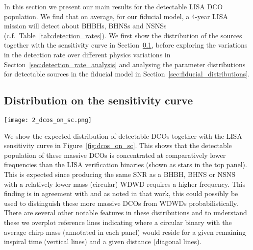 In this section we present our main results for the detectable LISA DCO population. We find that on average, for our fiducial model, a 4-year LISA mission will detect about \BHBHFourYear{} BHBHs, \BHNSFourYear{} BHNSs and \NSNSFourYear{} NSNSs (c.f.\ Table~\ref{tab:detection_rates}). We first show the distribution of the sources together with the sensitivity curve in Section~\ref{sec:dcos_on_sc}, before exploring the variations in the detection rate over different physics variations in Section~\ref{sec:detection_rate_analysis} and analysing the parameter distributions for detectable sources in the fiducial model in Section~\ref{sec:fiducial_distributions}.

\subsection{Distribution on the sensitivity curve}\label{sec:dcos_on_sc}

\begin{figure*}[tp]
    \centering
    \texttt{[image: 2\_dcos\_on\_sc.png]}
    \caption{Density distribution of detectable BHBH, BHNS and NSNS binaries are shown together with the LISA sensitivity curve. In the top panel we show all systems with the LISA verification binaries over plotted (star symbols, \citealp{Kupfer+2018}). In the bottom panels we separate by type. Contours show the percentage of the population enclosed. The remaining 2\% of the population is shown as dots with a size that scales with the sampling weight. For reference we show lines where a circular binary of average mass $\avg{\mathcal{M}_c}$ would reside for a given remaining inspiral time (vertical lines) and distance (diagonal line). To highlight the role of eccentricity we further show the signal expected for an eccentric binary at 30 kpc. The coloured line in the bottom panels shows a contour that encloses 90\% of the population that is circular. See Sec.~\ref{sec:dcos_on_sc} for a discussion.}
    \label{fig:dcos_on_sc}
\end{figure*}

We show the expected distribution of detectable DCOs together with the LISA sensitivity curve in Figure~\ref{fig:dcos_on_sc}. This shows that the detectable population of these massive DCOs is concentrated at comparatively lower frequencies than the LISA verification binaries (shown as stars in the top panel). This is expected since producing the same SNR as a BHBH, BHNS or NSNS with a relatively lower mass (circular) WDWD requires a higher frequency. This finding is in agreement with \citet{Sesana+2020} and as noted in that work, this could possibly be used to distinguish these more massive DCOs from WDWDs probabilistically. There are several other notable features in these distributions and to understand these we overplot reference lines indicating where a circular binary with the average chirp mass (annotated in each panel) would reside for a given remaining inspiral time (vertical lines) and a given distance (diagonal lines).

